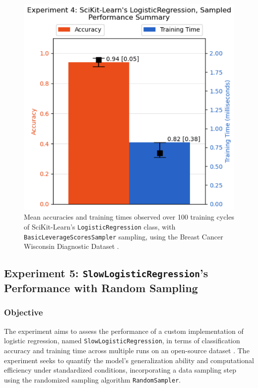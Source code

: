 \documentclass{article}
\theoremstyle{plain}
\theoremstyle{definition}
\theoremstyle{remark}
\begin{document}
\begin{figure}[ht]
	\vskip 0.2in
	\begin{center}
		\centerline{\includegraphics[width=\columnwidth]{experiment_04}}
		\caption{Mean accuracies and training times observed over 100 training cycles of SciKit-Learn's \texttt{LogisticRegression} class, with \texttt{BasicLeverageScoresSampler} sampling, using the Breast Cancer Wisconsin Diagnostic Dataset \cite{breastcancer}.}
		\label{experiment_04}
	\end{center}
	\vskip -0.2in
\end{figure}


\subsection{Experiment 5: \texttt{SlowLogisticRegression}'s Performance with Random Sampling}

\subsubsection{Objective}

The experiment aims to assess the performance of a custom implementation of logistic regression, named \texttt{SlowLogisticRegression}, in terms of classification accuracy and training time across multiple runs on an open-source dataset \cite{breastcancer}. The experiment seeks to quantify the model's generalization ability and computational efficiency under standardized conditions, incorporating a data sampling step using the randomized sampling algorithm \texttt{RandomSampler}.
\end{document}
